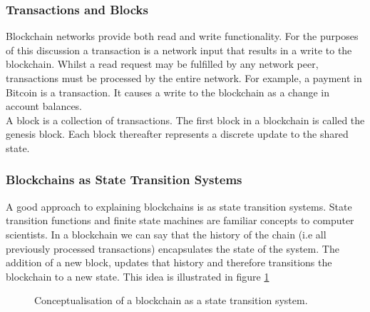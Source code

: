 \subsubsection{Transactions and Blocks}
Blockchain networks provide both read and write functionality. For the purposes of this discussion a transaction is a network input that results in a write to the blockchain. Whilst a read request may be fulfilled by any network peer, transactions must be processed by the entire network. For example, a payment in Bitcoin is a transaction. It causes a write to the blockchain as a change in account balances. \\

A block is a collection of transactions. The first block in a blockchain is called the genesis block. Each block thereafter represents a discrete update to the shared state. \\

\subsubsection{Blockchains as State Transition Systems}
A good approach to explaining blockchains is as state transition systems. State transition functions and finite state machines are familiar concepts to computer scientists. In a blockchain we can say that the history of the chain (i.e all previously processed transactions) encapsulates the state of the system. The addition of a new block, updates that history and therefore transitions the blockchain to a new state. This idea is illustrated in figure \ref{fig:blockchain_transition} \\

\begin{figure}
\centering
{}
\decoRule
\caption[Blockchain As State Transition]{Conceptualisation of a blockchain as a state transition system.}
\label{fig:blockchain_transition}
\end{figure}

